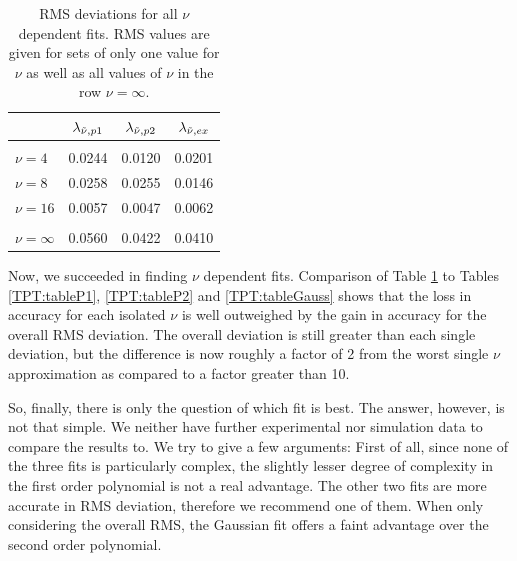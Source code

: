 \documentclass[8.5pt,twoside,twocolumn]{article}
\theoremstyle{standard}
\begin{document}
\begin{table}[h]
  \centering
  \caption{RMS deviations for all $\nu$ dependent fits. RMS values are given for sets of only
  one value for $\nu$ as well as all values of $\nu$ in the row $\nu=\infty$.}
    \begin{tabular}{l | ccc}
         & $\lambda_{\tilde \nu,{p1}}$ & $\lambda_{\tilde \nu,{p2}}$ & $\lambda_{\tilde \nu,{ex}}$\\[2pt] 
    \hline
    & & \\[-.25cm]
    $\nu=4$ & 0.0244 & 0.0120 & 0.0201 \\
    $\nu=8$ & 0.0258 & 0.0255 & 0.0146 \\
    $\nu=16$ & 0.0057 & 0.0047 & 0.0062\\[2pt] \hline
    & & & \\[-.32cm]
    $\nu=\infty$ &  0.0560 & 0.0422 & 0.0410 \\[2pt]
    \hline
    \end{tabular}%
    \label{TPT:table:NdepRMS}
\end{table}%
Now, we succeeded in finding $\nu$ dependent fits. Comparison of Table \ref{TPT:table:NdepRMS}
to Tables \ref{TPT:tableP1}, \ref{TPT:tableP2} and \ref{TPT:tableGauss} shows that
the loss in accuracy for each isolated $\nu$ is well outweighed by the gain in accuracy
for the overall RMS deviation. The overall deviation is still greater than each single
deviation, but the difference is now roughly a factor of 2 from the worst single $\nu$ approximation
as compared to a factor greater than 10. 

So, finally, there is only the question of which fit is best. The answer, however, is not that
simple. We neither have further experimental nor simulation data to compare the
results to. We try to give a few arguments: First of all, since none of the three
fits is particularly complex, the slightly lesser degree of complexity in the first
order polynomial is not a real advantage. The other two fits are more accurate
in RMS deviation, therefore we recommend one of them. When only considering the overall RMS, the
Gaussian fit offers a faint advantage over the second order polynomial.   
\end{document}
